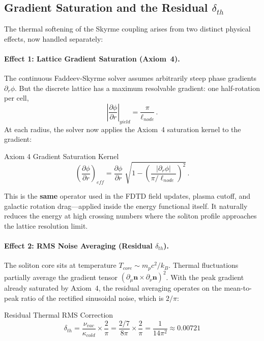 \subsection{Gradient Saturation and the Residual $\delta_{th}$}

The thermal softening of the Skyrme coupling arises from two distinct physical effects, now handled separately:

\paragraph{Effect 1: Lattice Gradient Saturation (Axiom~4).}
The continuous Faddeev-Skyrme solver assumes arbitrarily steep phase gradients $\partial_r \phi$. But the discrete lattice has a maximum resolvable gradient: one half-rotation per cell,
\begin{equation}
    \left|\frac{\partial\phi}{\partial r}\right|_{yield} = \frac{\pi}{\ell_{node}}\,.
\end{equation}
At each radius, the solver now applies the Axiom~4 saturation kernel to the gradient:
\begin{resultbox}{Axiom 4 Gradient Saturation Kernel}
\begin{equation}
    \left(\frac{\partial\phi}{\partial r}\right)_{\!eff}
    = \frac{\partial\phi}{\partial r}\;\sqrt{1 - \left(\frac{|\partial_r\phi|}{\pi/\ell_{node}}\right)^{\!2}}\,.
\end{equation}
\end{resultbox}
This is the \textbf{same} operator used in the FDTD field updates, plasma cutoff, and galactic rotation drag---applied inside the energy functional itself.  It naturally reduces the energy at high crossing numbers where the soliton profile approaches the lattice resolution limit.

\paragraph{Effect 2: RMS Noise Averaging (Residual $\delta_{th}$).}
The soliton core sits at temperature $T_{core} \sim m_p c^2/k_B$.  Thermal fluctuations partially average the gradient tensor $(\partial_\mu \mathbf{n} \times \partial_\nu \mathbf{n})^2$.  With the peak gradient already saturated by Axiom~4, the residual averaging operates on the mean-to-peak ratio of the rectified sinusoidal noise, which is $2/\pi$:
\begin{resultbox}{Residual Thermal RMS Correction}
\begin{equation}
    \delta_{th} = \frac{\nu_{vac}}{\kappa_{cold}} \times \frac{2}{\pi}
    = \frac{2/7}{8\pi} \times \frac{2}{\pi}
    = \frac{1}{14\pi^2} \approx 0.00721
    \label{eq:delta_th}
\end{equation}
\end{resultbox}

